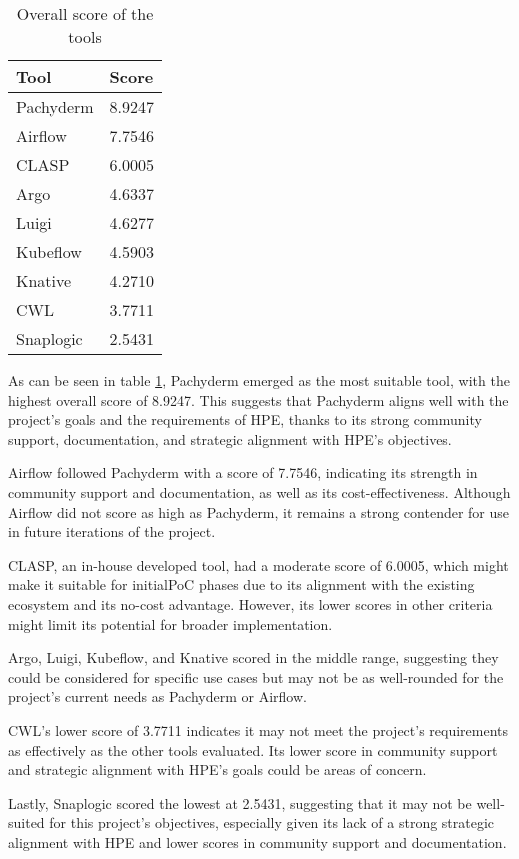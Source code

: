 \begin{table}[H]
\centering
\begin{tabular}{|l|l|} \hline
    \textbf{Tool} & \textbf{Score} \\ \hline
    Pachyderm     & 8.9247         \\ \hline
    Airflow       & 7.7546         \\ \hline
    CLASP         & 6.0005         \\ \hline
    Argo          & 4.6337         \\ \hline
    Luigi         & 4.6277         \\ \hline
    Kubeflow      & 4.5903         \\ \hline
    Knative       & 4.2710         \\ \hline
    CWL           & 3.7711         \\ \hline
    Snaplogic     & 2.5431         \\ \hline
\end{tabular}
\caption{Overall score of the tools}
\label{tab:overall_score_of_the_tools}
\end{table}


As can be seen in table \ref{tab:overall_score_of_the_tools}, Pachyderm emerged as the most suitable tool, with the highest overall score of 8.9247. 
This suggests that Pachyderm aligns well with the project's goals and the requirements of HPE, thanks to its strong community support, documentation, and strategic alignment with HPE's objectives.

Airflow followed Pachyderm with a score of 7.7546, indicating its strength in community support and documentation, as well as its cost-effectiveness.
Although Airflow did not score as high as Pachyderm, it remains a strong contender for use in future iterations of the project.

CLASP, an in-house developed tool, had a moderate score of 6.0005, which might make it suitable for initial\ac{PoC} phases due to its alignment with the existing ecosystem and its no-cost advantage.
However, its lower scores in other criteria might limit its potential for broader implementation.

Argo, Luigi, Kubeflow, and Knative scored in the middle range,
suggesting they could be considered for specific use cases but may not be as well-rounded for the project's current needs as Pachyderm or Airflow.

CWL's lower score of 3.7711 indicates it may not meet the project's requirements as effectively as the other tools evaluated.
Its lower score in community support and strategic alignment with HPE's goals could be areas of concern.

Lastly, Snaplogic scored the lowest at 2.5431, suggesting that it may not be well-suited for this project's objectives,
especially given its lack of a strong strategic alignment with HPE and lower scores in community support and documentation. 